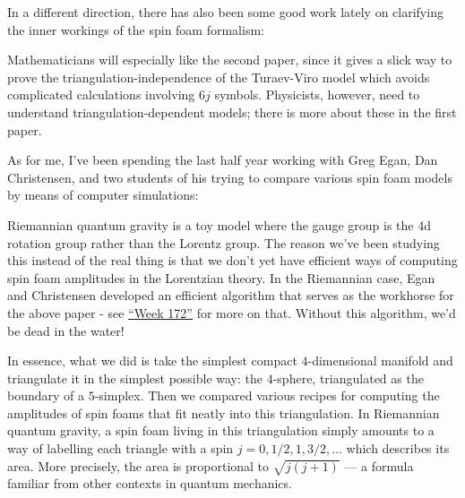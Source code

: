 \documentclass{article}
\def\tightlist{}
\renewcommand{\texttt}[1]{%
  \begingroup
  \ttfamily
  \begingroup\lccode`~=`/\lowercase{\endgroup\def~}{/\discretionary{}{}{}}%
  \begingroup\lccode`~=`[\lowercase{\endgroup\def~}{[\discretionary{}{}{}}%
  \begingroup\lccode`~=`.\lowercase{\endgroup\def~}{.\discretionary{}{}{}}%
  \catcode`/=\active\catcode`[=\active\catcode`.=\active
  \scantokens{#1\noexpand}%
  \endgroup
}
\begin{document}
In a different direction, there has also been some good work lately on
clarifying the inner workings of the spin foam formalism:


Mathematicians will especially like the second paper, since it gives a
slick way to prove the triangulation-independence of the Turaev-Viro
model which avoids complicated calculations involving \(6j\) symbols.
Physicists, however, need to understand triangulation-dependent models;
there is more about these in the first paper.

As for me, I've been spending the last half year working with Greg Egan,
Dan Christensen, and two students of his trying to compare various spin
foam models by means of computer simulations:


Riemannian quantum gravity is a toy model where the gauge group is the
4d rotation group rather than the Lorentz group. The reason we've been
studying this instead of the real thing is that we don't yet have
efficient ways of computing spin foam amplitudes in the Lorentzian
theory. In the Riemannian case, Egan and Christensen developed an
efficient algorithm that serves as the workhorse for the above paper -
see \protect\hyperlink{week172}{``Week 172''} for more on that. Without
this algorithm, we'd be dead in the water!

In essence, what we did is take the simplest compact \(4\)-dimensional
manifold and triangulate it in the simplest possible way: the
\(4\)-sphere, triangulated as the boundary of a \(5\)-simplex. Then we
compared various recipes for computing the amplitudes of spin foams that
fit neatly into this triangulation. In Riemannian quantum gravity, a
spin foam living in this triangulation simply amounts to a way of
labelling each triangle with a spin \(j = 0, 1/2, 1, 3/2,\ldots\) which
describes its area. More precisely, the area is proportional to
\(\sqrt{j(j+1)}\) --- a formula familiar from other contexts in quantum
mechanics.
\end{document}
